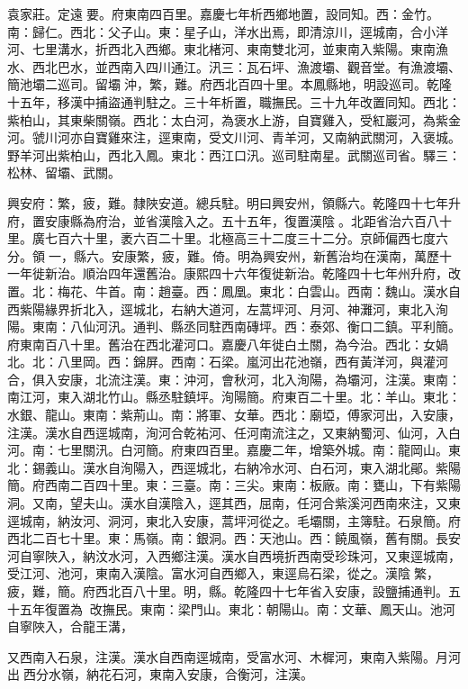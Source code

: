 \begin{pinyinscope}
袁家莊。定遠要。府東南四百里。嘉慶七年析西鄉地置，設同知。西：金竹。南：歸仁。西北：父子山。東：星子山，洋水出焉，即清涼川，逕城南，合小洋河、七里溝水，折西北入西鄉。東北楮河、東南雙北河，並東南入紫陽。東南漁水、西北巴水，並西南入四川通江。汛三：瓦石坪、漁渡壩、觀音堂。有漁渡壩、簡池壩二巡司。留壩沖，繁，難。府西北百四十里。本鳳縣地，明設巡司。乾隆十五年，移漢中捕盜通判駐之。三十年析置，職撫民。三十九年改置同知。西北：紫柏山，其東柴關嶺。西北：太白河，為褒水上游，自寶雞入，受紅巖河，為紫金河。虢川河亦自寶雞來注，逕東南，受文川河、青羊河，又南納武關河，入褒城。野羊河出紫柏山，西北入鳳。東北：西江口汛。巡司駐南星。武關巡司省。驛三：松林、留壩、武關。

興安府：繁，疲，難。隸陜安道。總兵駐。明曰興安州，領縣六。乾隆四十七年升府，置安康縣為府治，並省漢陰入之。五十五年，復置漢陰。北距省治六百八十里。廣七百六十里，袤六百二十里。北極高三十二度三十二分。京師偏西七度六分。領一，縣六。安康繁，疲，難。倚。明為興安州，新舊治均在漢南，萬歷十一年徙新治。順治四年還舊治。康熙四十六年復徙新治。乾隆四十七年州升府，改置。北：梅花、牛首。南：趙臺。西：鳳凰。東北：白雲山。西南：魏山。漢水自西紫陽緣界折北入，逕城北，右納大道河，左蒿坪河、月河、神灘河，東北入洵陽。東南：八仙河汛。通判、縣丞同駐西南磚坪。西：泰郊、衡口二鎮。平利簡。府東南百八十里。舊治在西北灌河口。嘉慶八年徙白土關，為今治。西北：女媧北。北：八里岡。西：錦屏。西南：石梁。嵐河出花池嶺，西有黃洋河，與灌河合，俱入安康，北流注漢。東：沖河，會秋河，北入洵陽，為壩河，注漢。東南：南江河，東入湖北竹山。縣丞駐鎮坪。洵陽簡。府東百二十里。北：羊山。東北：水銀、龍山。東南：紫荊山。南：將軍、女華。西北：廟埡，傅家河出，入安康，注漢。漢水自西逕城南，洵河合乾祐河、任河南流注之，又東納蜀河、仙河，入白河。南：七里關汛。白河簡。府東四百里。嘉慶二年，增築外城。南：龍岡山。東北：錫義山。漢水自洵陽入，西逕城北，右納冷水河、白石河，東入湖北鄖。紫陽簡。府西南二百四十里。東：三臺。南：三尖。東南：板廠。南：甕山，下有紫陽洞。又南，望夫山。漢水自漢陰入，逕其西，屈南，任河合紫溪河西南來注，又東逕城南，納汝河、洞河，東北入安康，蒿坪河從之。毛壩關，主簿駐。石泉簡。府西北二百七十里。東：馬嶺。南：銀洞。西：天池山。西：饒風嶺，舊有關。長安河自寧陜入，納汶水河，入西鄉注漢。漢水自西境折西南受珍珠河，又東逕城南，受江河、池河，東南入漢陰。富水河自西鄉入，東逕烏石梁，從之。漢陰繁，疲，難，簡。府西北百八十里。明，縣。乾隆四十七年省入安康，設鹽捕通判。五十五年復置為，改撫民。東南：梁門山。東北：朝陽山。南：文華、鳳天山。池河自寧陜入，合龍王溝，

又西南入石泉，注漢。漢水自西南逕城南，受富水河、木樨河，東南入紫陽。月河出西分水嶺，納花石河，東南入安康，合衡河，注漢。


\end{pinyinscope}
